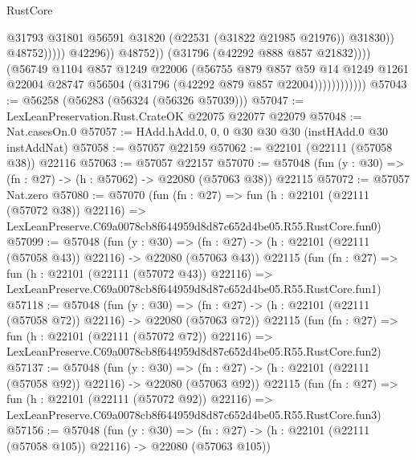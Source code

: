 \begin{lexlean}{RustCore}
\begin{coremodule}
                                              @31793
                                              @31801
                                              @56591
                                              @31820
                                              (@22531 (@31822 @21985 @21976))
                                              @31830))
                                          @48752)))))
                                @42296))
                            @48752))
                        (@31796 (@42292 @888 @857 @21832))))
                    (@56749
                      @1104
                      @857
                      @1249
                      @22006
                      (@56755
                        @879
                        @857
                        @59
                        @14
                        @1249
                        @1261
                        @22004
                        @28747
                        @56504
                        (@31796 (@42292 @879 @857 @22004))))))))))))
@57043 := @56258 (@56283 (@56324 (@56326 @57039)))
@57047 := LexLeanPreservation.Rust.CrateOK @22075 @22077 @22079
@57048 := Nat.casesOn.{0}
@57057 := HAdd.hAdd.{0, 0, 0} @30 @30 @30 (instHAdd.{0} @30 instAddNat)
@57058 := @57057 @22159
@57062 := @22101 (@22111 (@57058 @38)) @22116
@57063 := @57057 @22157
@57070 := @57048 (fun (y : @30) => (fn : @27) -> (h : @57062) -> @22080 (@57063 @38)) @22115
@57072 := @57057 Nat.zero
@57080 := @57070
    (fun (fn : @27) =>
    fun (h : @22101 (@22111 (@57072 @38)) @22116) =>
    LexLeanPreserve.C69a0078cb8f644959d8d87c652d4be05.R55.RustCore.fun0)
@57099 := @57048
    (fun (y : @30) =>
    (fn : @27) -> (h : @22101 (@22111 (@57058 @43)) @22116) -> @22080 (@57063 @43))
    @22115
    (fun (fn : @27) =>
    fun (h : @22101 (@22111 (@57072 @43)) @22116) =>
    LexLeanPreserve.C69a0078cb8f644959d8d87c652d4be05.R55.RustCore.fun1)
@57118 := @57048
    (fun (y : @30) =>
    (fn : @27) -> (h : @22101 (@22111 (@57058 @72)) @22116) -> @22080 (@57063 @72))
    @22115
    (fun (fn : @27) =>
    fun (h : @22101 (@22111 (@57072 @72)) @22116) =>
    LexLeanPreserve.C69a0078cb8f644959d8d87c652d4be05.R55.RustCore.fun2)
@57137 := @57048
    (fun (y : @30) =>
    (fn : @27) -> (h : @22101 (@22111 (@57058 @92)) @22116) -> @22080 (@57063 @92))
    @22115
    (fun (fn : @27) =>
    fun (h : @22101 (@22111 (@57072 @92)) @22116) =>
    LexLeanPreserve.C69a0078cb8f644959d8d87c652d4be05.R55.RustCore.fun3)
@57156 := @57048
    (fun (y : @30) =>
    (fn : @27) -> (h : @22101 (@22111 (@57058 @105)) @22116) -> @22080 (@57063 @105))

\end{coremodule}
\end{lexlean}
